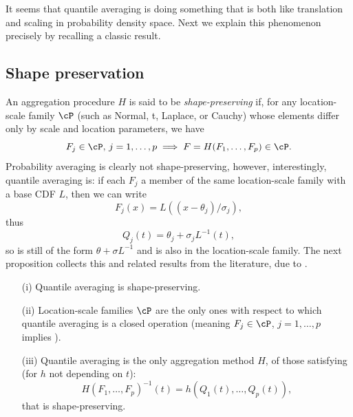 \documentclass{article}
\begin{document}
It seems that quantile averaging is doing something that is both like
translation and scaling in probability density space. Next we explain this
phenomenon precisely by recalling a classic result.   

\subsection{Shape preservation}

An aggregation procedure $H$ is said to be \emph{shape-preserving} if, for any
location-scale family $\cP$ (such as Normal, t, Laplace, or Cauchy) whose
elements differ only by scale and location parameters, we have     
\[ 
F_j \in \cP, \, j=1,\dots,p \implies F = H(F_1,\dots,F_p) \in \cP.  
\]
Probability averaging is clearly not shape-preserving, however, interestingly,
quantile averaging is: if each $F_j$ a member of the same location-scale family
with a base CDF $L$, then we can write 
\[
F_j(x) = L((x-\theta_j)/\sigma_j),
\]
thus
\[
Q_j(t) = \theta_j + \sigma_j L^{-1}(t),
\]
so  is still of the form $\theta + \sigma L^{-1}$ and
 is also in the location-scale family. The next proposition
collects this and related results from the literature, due to
\citet{thomas1980appropriate, genest1992vincentization}.  

\begin{proposition}
\label{prop:shape_preservation} \hfill 
\begin{itemize}
\item[(i)] Quantile averaging is shape-preserving.        
\item[(ii)] Location-scale families $\cP$ are the only ones with respect to
  which quantile averaging is a closed operation (meaning $F_j \in \cP$,
  $j=1,\dots,p$ implies ).     
\item[(iii)] Quantile averaging is the only aggregation method $H$, of those 
  satisfying (for $h$ not depending on $t$):  
  \[
    H(F_1,\dots,F_p)^{-1}(t) = h(Q_1(t),\dots,Q_p(t)),
  \]
  that is shape-preserving.
\end{itemize}
\end{proposition}
\end{document}

